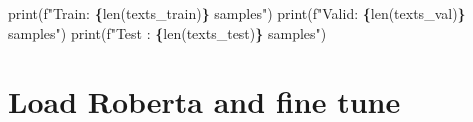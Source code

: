 \documentclass[
]{article}
\newenvironment{Shaded}{\begin{snugshade}}{\end{snugshade}}
\newcommand{\BuiltInTok}[1]{#1}
\newcommand{\NormalTok}[1]{#1}
\newcommand{\SpecialCharTok}[1]{\textcolor[rgb]{0.81,0.36,0.00}{\textbf{#1}}}
\newcommand{\SpecialStringTok}[1]{\textcolor[rgb]{0.31,0.60,0.02}{#1}}
\begin{document}
\begin{Shaded}
\begin{Highlighting}[]
\BuiltInTok{print}\NormalTok{(}\SpecialStringTok{f"Train: }\SpecialCharTok{\{}\BuiltInTok{len}\NormalTok{(texts\_train)}\SpecialCharTok{\}}\SpecialStringTok{ samples"}\NormalTok{)}
\BuiltInTok{print}\NormalTok{(}\SpecialStringTok{f"Valid: }\SpecialCharTok{\{}\BuiltInTok{len}\NormalTok{(texts\_val)}\SpecialCharTok{\}}\SpecialStringTok{ samples"}\NormalTok{)}
\BuiltInTok{print}\NormalTok{(}\SpecialStringTok{f"Test : }\SpecialCharTok{\{}\BuiltInTok{len}\NormalTok{(texts\_test)}\SpecialCharTok{\}}\SpecialStringTok{ samples"}\NormalTok{)}
\end{Highlighting}
\end{Shaded}

\section{Load Roberta and fine tune}\label{load-roberta-and-fine-tune}
\end{document}

